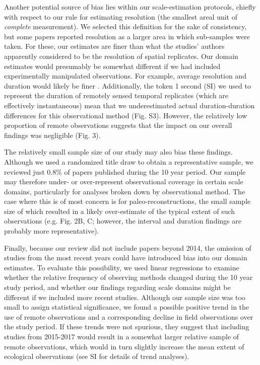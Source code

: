 \documentclass[12pt]{article}
\begin{document}
Another potential source of bias lies within our scale-estimation protocols, chiefly with respect to our rule for estimating resolution (the smallest areal unit of \emph{complete} measurement). We selected this definition for the sake of consistency, but some papers reported resolution as a larger area in which sub-samples were taken. For these, our estimates are finer than what the studies' authors apparently considered to be the resolution of spatial replicates. Our domain estimates would presumably be somewhat different if we had included experimentally manipulated observations. For example, average resolution and duration would likely be finer \cite{tilman_ecological_1989,kareiva_spatial_1988}. Additionally, the token 1 second (SI) we used to represent the duration of remotely sensed temporal replicates (which are effectively instantaneous) mean that we underestimated actual duration-duration differences for this observational method (Fig. S3). However, the relatively low proportion of remote observations suggests that the impact on our overall findings was negligible (Fig. 3).  

The relatively small sample size of our study may also bias these findings. Although we used a randomized title draw to obtain a representative sample, we reviewed just 0.8\% of papers published during the 10 year period. Our sample may therefore under- or over-represent observational coverage in certain scale domains, particularly for analyses broken down by observational method. The case where this is of most concern is for paleo-reconstructions, the small sample size of which resulted in a likely over-estimate of the typical extent of such observations (e.g. Fig. 2B, C; however, the interval and duration findings are probably more representative).     

Finally, because our review did not include papers beyond 2014, the omission of studies from the most recent years could have introduced bias into our domain estimates. To evaluate this possibility, we used linear regressions to examine whether the relative frequency of observing methods changed during the 10 year study period, and whether our findings regarding scale domains might be different if we included more recent studies. Although our sample size was too small to assign statistical significance, we found a possible positive trend in the use of remote observations and a corresponding decline in field observations over the study period. If these trends were not spurious, they suggest that including studies from 2015-2017 would result in a somewhat larger relative sample of remote observations, which would in turn slightly increase the mean extent of ecological observations (see SI for details of trend analyses).   
\end{document}
